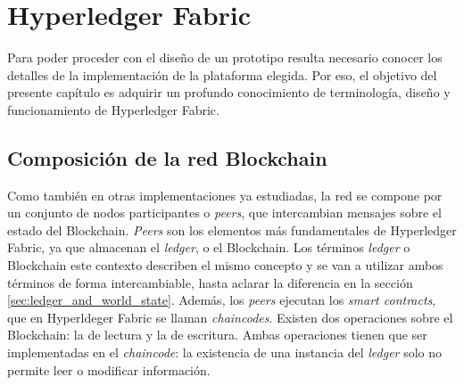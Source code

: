 
\chapter{Hyperledger Fabric} %

\label{Chapter3} %

Para poder proceder con el diseño de un prototipo resulta necesario conocer los detalles de la implementación de la plataforma elegida. Por eso, el objetivo del presente capítulo es adquirir un profundo conocimiento de terminología, diseño y funcionamiento de Hyperledger Fabric.


\section{Composición de la red Blockchain}
\label{composicion_red_blockchain}
Como también en otras implementaciones ya estudiadas, la red se compone por un conjunto de nodos participantes o \textit{peers}, que intercambian mensajes sobre el estado del Blockchain. \textit{Peers} son los elementos más fundamentales de Hyperledger Fabric, ya que almacenan el \textit{ledger}, o el Blockchain.
Los términos \textit{ledger} o Blockchain este contexto describen el mismo concepto y se van a utilizar ambos términos de forma intercambiable, hasta aclarar la diferencia en la sección \ref{sec:ledger_and_world_state}.
Además, los \textit{peers} ejecutan los \textit{smart contracts}, que en Hyperldeger Fabric se llaman \textit{chaincodes}. Existen dos operaciones sobre el Blockchain: la de lectura y la de escritura. Ambas operaciones tienen que ser implementadas en el \textit
{chaincode}: la existencia de una instancia del \textit{ledger} solo no permite leer o modificar información.

